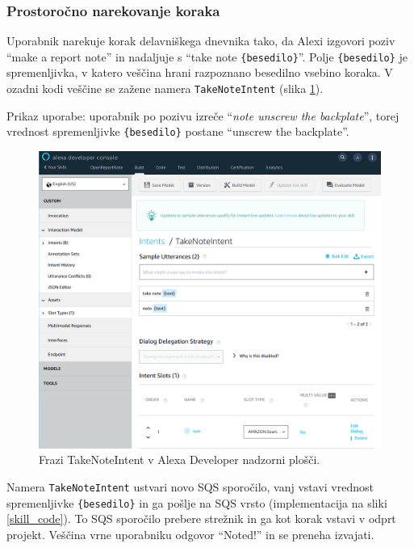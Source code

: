 \documentclass[a4paper, 12pt]{book}
\begin{document}
\subsubsection{Prostoročno narekovanje koraka}

Uporabnik narekuje korak delavniškega dnevnika tako, da Alexi izgovori poziv \enquote{make a report note} in nadaljuje s \enquote{take note \texttt{\{besedilo\}}}.
Polje \texttt{\{besedilo\}} je spremenljivka, v katero veščina hrani razpoznano besedilno vsebino koraka.
V ozadni kodi veščine se zažene namera \texttt{TakeNoteIntent} (slika \ref{TakeNoteIntent}).

Prikaz uporabe: uporabnik po pozivu izreče \enquote{\textit{note unscrew the backplate}}, torej vrednost spremenljivke \texttt{\{besedilo\}} postane \enquote{unscrew the backplate}.



\begin{figure}[H]
\begin{center}
\includegraphics[width=13cm]{intent_literal}
\end{center}
\caption{Frazi TakeNoteIntent v Alexa Developer nadzorni plošči.}
\label{TakeNoteIntent}
\end{figure}

Namera \texttt{TakeNoteIntent} ustvari novo SQS sporočilo, vanj vstavi vrednost spremenljivke \texttt{\{besedilo\}} in ga pošlje na SQS vrsto (implementacija na sliki \ref{skill_code}).
To SQS sporočilo prebere strežnik in ga kot korak vstavi v odprt projekt.
Veščina vrne uporabniku odgovor \enquote{Noted!} in se preneha izvajati.
\end{document}
